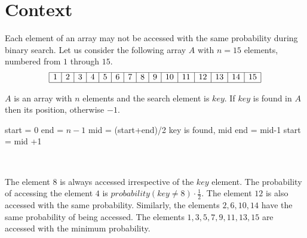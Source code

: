 \documentclass[11pt,a4]{article}
\begin{document}
\section*{Context}
Each element of an array may not be accessed with the same probability during binary search. Let us consider the following array $A$ with $n=15$ elements, numbered from $1$ through $15$.
\[
\begin{array}{|*{15}{c|}}
\hline
1 & 2 & 3 & 4 & 5 & 6 & 7 & 8 & 9 & 10 & 11 & 12 & 13 & 14 & 15 \\
\hline
\end{array}
\] 
\begin{algorithmic}
	\Require $A$ is an array with $n$ elements and the search element is $key$.
	\Ensure If $key$ is found in $A$ then its position, otherwise $-1$.
\end{algorithmic}
\begin{minipage}{0.4\linewidth}
\begin{algorithmic}
	\State start = $0$
	\State end = $n-1$
	\State mid = (start+end)/2
	\State key is found, \Return mid
	\State end = mid-1
	\Else
	\State start = mid +1
	\EndIf
	\EndWhile
	\State {}
\end{algorithmic}
\end{minipage}
$\quad$
\begin{minipage}{0.56\linewidth}
\end{minipage}

\medskip

The element $8$ is always accessed irrespective of the $key$ element. The probability of accessing the element $4$ is $probability(key\ne 8)\cdot\frac{1}{2}$. The element $12$ is also accessed with the same probability. Similarly, the elements $2,6,10,14$ have the same probability of being accessed. The elements $1,3,5,7,9,11,13,15$ are accessed with the minimum probability.
\end{document}
